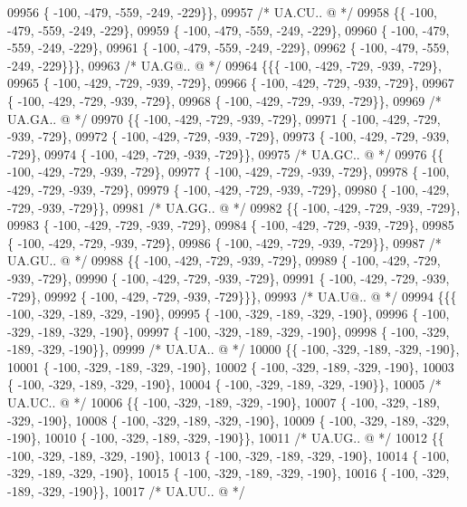 \begin{DoxyCode}
09956 \{ -100, -479, -559, -249, -229\}\},
09957 \textcolor{comment}{/* UA.CU.. @ */}
09958 \{\{ -100, -479, -559, -249, -229\},
09959 \{ -100, -479, -559, -249, -229\},
09960 \{ -100, -479, -559, -249, -229\},
09961 \{ -100, -479, -559, -249, -229\},
09962 \{ -100, -479, -559, -249, -229\}\}\},
09963 \textcolor{comment}{/* UA.G@.. @ */}
09964 \{\{\{ -100, -429, -729, -939, -729\},
09965 \{ -100, -429, -729, -939, -729\},
09966 \{ -100, -429, -729, -939, -729\},
09967 \{ -100, -429, -729, -939, -729\},
09968 \{ -100, -429, -729, -939, -729\}\},
09969 \textcolor{comment}{/* UA.GA.. @ */}
09970 \{\{ -100, -429, -729, -939, -729\},
09971 \{ -100, -429, -729, -939, -729\},
09972 \{ -100, -429, -729, -939, -729\},
09973 \{ -100, -429, -729, -939, -729\},
09974 \{ -100, -429, -729, -939, -729\}\},
09975 \textcolor{comment}{/* UA.GC.. @ */}
09976 \{\{ -100, -429, -729, -939, -729\},
09977 \{ -100, -429, -729, -939, -729\},
09978 \{ -100, -429, -729, -939, -729\},
09979 \{ -100, -429, -729, -939, -729\},
09980 \{ -100, -429, -729, -939, -729\}\},
09981 \textcolor{comment}{/* UA.GG.. @ */}
09982 \{\{ -100, -429, -729, -939, -729\},
09983 \{ -100, -429, -729, -939, -729\},
09984 \{ -100, -429, -729, -939, -729\},
09985 \{ -100, -429, -729, -939, -729\},
09986 \{ -100, -429, -729, -939, -729\}\},
09987 \textcolor{comment}{/* UA.GU.. @ */}
09988 \{\{ -100, -429, -729, -939, -729\},
09989 \{ -100, -429, -729, -939, -729\},
09990 \{ -100, -429, -729, -939, -729\},
09991 \{ -100, -429, -729, -939, -729\},
09992 \{ -100, -429, -729, -939, -729\}\}\},
09993 \textcolor{comment}{/* UA.U@.. @ */}
09994 \{\{\{ -100, -329, -189, -329, -190\},
09995 \{ -100, -329, -189, -329, -190\},
09996 \{ -100, -329, -189, -329, -190\},
09997 \{ -100, -329, -189, -329, -190\},
09998 \{ -100, -329, -189, -329, -190\}\},
09999 \textcolor{comment}{/* UA.UA.. @ */}
10000 \{\{ -100, -329, -189, -329, -190\},
10001 \{ -100, -329, -189, -329, -190\},
10002 \{ -100, -329, -189, -329, -190\},
10003 \{ -100, -329, -189, -329, -190\},
10004 \{ -100, -329, -189, -329, -190\}\},
10005 \textcolor{comment}{/* UA.UC.. @ */}
10006 \{\{ -100, -329, -189, -329, -190\},
10007 \{ -100, -329, -189, -329, -190\},
10008 \{ -100, -329, -189, -329, -190\},
10009 \{ -100, -329, -189, -329, -190\},
10010 \{ -100, -329, -189, -329, -190\}\},
10011 \textcolor{comment}{/* UA.UG.. @ */}
10012 \{\{ -100, -329, -189, -329, -190\},
10013 \{ -100, -329, -189, -329, -190\},
10014 \{ -100, -329, -189, -329, -190\},
10015 \{ -100, -329, -189, -329, -190\},
10016 \{ -100, -329, -189, -329, -190\}\},
10017 \textcolor{comment}{/* UA.UU.. @ */}

\end{DoxyCode}
